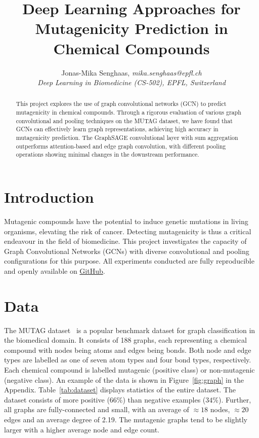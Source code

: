 \documentclass[10pt,conference,compsocconf]{ieee}
\begin{document}
\title{Deep Learning Approaches for Mutagenicity Prediction in Chemical Compounds}

\author{
  Jonas-Mika Senghaas, \textit{mika.senghaas@epfl.ch} \\
  \textit{Deep Learning in Biomedicine (CS-502), EPFL, Switzerland}
}

\maketitle

\begin{abstract}

This project explores the use of graph convolutional networks (GCN) to predict
mutagenicity in chemical compounds. Through a rigorous evaluation of various
graph convolutional and pooling techniques on the MUTAG dataset, we have found
that GCNs can effectively learn graph representations, achieving high accuracy
in mutagenicity prediction. The GraphSAGE convolutional layer with sum
aggregation outperforms attention-based and edge graph convolution, with
different pooling operations showing minimal changes in the downstream
performance.

\end{abstract}


\section{Introduction}

Mutagenic compounds have the potential to induce genetic mutations in living
organisms, elevating the risk of cancer. Detecting mutagenicity is thus a
critical endeavour in the field of biomedicine. This project investigates the
capacity of Graph Convolutional Networks (GCNs) with diverse convolutional and
pooling configurations for this purpose. All experiments conducted are fully
reproducible and openly available on
\href{https://github.com/mikasenghaas/cs502}{GitHub}.

\section{Data}

The MUTAG dataset~\cite{mutag} is a popular benchmark dataset for graph
classification in the biomedical domain. It consists of 188 graphs, each
representing a chemical compound with nodes being atoms and edges being bonds.
Both node and edge types are labelled as one of seven atom types and four bond
types, respectively. Each chemical compound is labelled mutagenic (positive
class) or non-mutagenic (negative class). An example of the data is shown in
Figure~\ref{fig:graph} in the Appendix. Table~\ref{tab:dataset} displays
statistics of the entire dataset. The dataset consists of more positive ($66\%$)
than negative examples ($34\%$). Further, all graphs are fully-connected and
small, with an average of $\approx 18$ nodes, $\approx 20$ edges and an average
degree of 2.19. The mutagenic graphs tend to be slightly larger with a higher
average node and edge count. 
\end{document}
